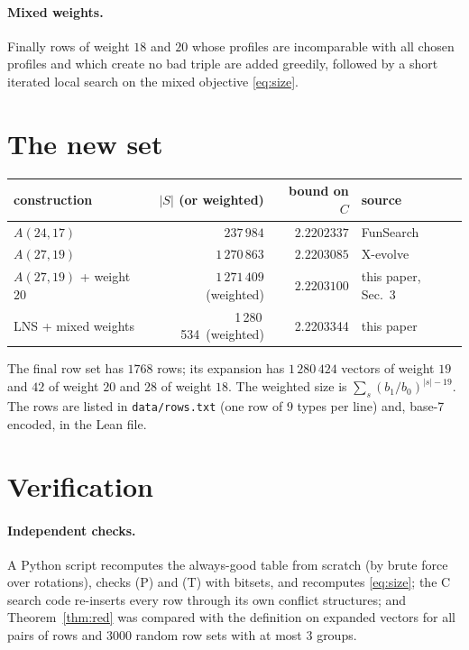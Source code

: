 \documentclass[11pt]{article}
\numberwithin{equation}{section}
\theoremstyle{definition}
\theoremstyle{remark}
\newcommand{\NROWS}{1768}
\newcommand{\NWNINE}{1\,280\,424}
\newcommand{\NWOTHER}{$42$ of weight $20$ and $28$ of weight $18$}
\newcommand{\NEFF}{1\,280\,534}
\newcommand{\NBOUND}{2.2203344}
\begin{document}
\paragraph{Mixed weights.}  Finally rows of weight $18$ and $20$ whose profiles are incomparable with
all chosen profiles and which create no bad triple are added greedily, followed by a short iterated
local search on the mixed objective \eqref{eq:size}.

\section{The new set}
\begin{center}
\begin{tabular}{lrrl}
\toprule
construction & $|S|$ (or weighted) & bound on $C$ & source\\
\midrule
$A(24,17)$ & $237\,984$ & $2.2202337$ & FunSearch \cite{FunSearch}\\
$A(27,19)$ & $1\,270\,863$ & $2.2203085$ & X-evolve \cite{Xevolve}\\
$A(27,19)$ + weight $20$ & $1\,271\,409$ (weighted) & $2.2203100$ & this paper, Sec.~3\\
LNS + mixed weights & \NEFF\ (weighted) & \NBOUND & this paper\\
\bottomrule
\end{tabular}
\end{center}
The final row set has $\NROWS$ rows; its expansion has $\NWNINE$ vectors of weight $19$ and \NWOTHER.
The weighted size is $\sum_{s} (b_1/b_0)^{|s|-19}$.  The rows are listed in
\texttt{data/rows.txt} (one row of $9$ types per line) and, base-7 encoded, in the Lean file.

\section{Verification}
\paragraph{Independent checks.}  A Python script recomputes the always-good table from scratch (by brute
force over rotations), checks (P) and (T) with bitsets, and recomputes \eqref{eq:size}; the C search code
re-inserts every row through its own conflict structures; and Theorem~\ref{thm:red} was compared with the
definition on expanded vectors for all pairs of rows and $3000$ random row sets with at most $3$ groups.
\end{document}
